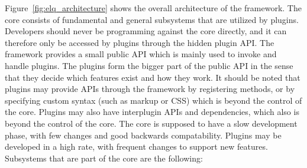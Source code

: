 \documentclass[a4paper,11pt]{kth-mag}
\begin{document}
        

        Figure~\ref{fig:elq_architecture} shows the overall architecture of the framework.
        The core consists of fundamental and general subsystems that are utilized by plugins.
        Developers should never be programming against the core directly, and it can therefore only be accessed by plugins through the hidden plugin \gls{API}.
        The framework provides a small public \gls{API} which is mainly used to invoke and handle plugins.
        The plugins form the bigger part of the public \gls{API} in the sense that they decide which features exist and how they work.
        It should be noted that plugins may provide \glspl{API} through the framework by registering methods, or by specifying custom syntax (such as markup or \gls{CSS}) which is beyond the control of the core.
        Plugins may also have interplugin \glspl{API} and dependencies, which also is beyond the control of the core.
        The core is supposed to have a slow development phase, with few changes and good backwards compatability.
        Plugins may be developed in a high rate, with frequent changes to support new features.
        Subsystems that are part of the core are the following:
\end{document}
